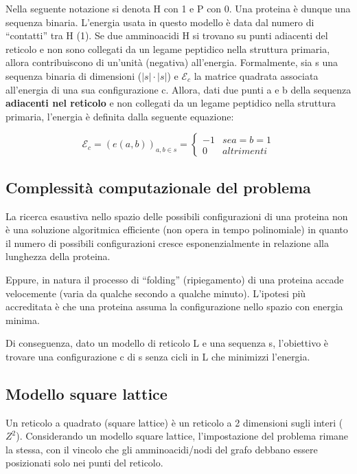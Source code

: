 \documentclass[conference]{IEEEtran}
\begin{document}
Nella seguente notazione si denota H con 1 e P con 0. Una proteina è dunque una sequenza binaria. L'energia usata in questo modello è data dal numero di ``contatti'' tra H (1). Se due amminoacidi H si trovano su punti adiacenti del reticolo e non sono collegati da un legame peptidico nella struttura primaria, allora contribuiscono di un'unità (negativa) all'energia.
Formalmente, sia s una sequenza binaria di dimensioni ($|s|\cdot|s|$) e $\mathcal{E}_c$ la matrice quadrata associata all'energia di una sua configurazione c. Allora, dati due punti a e b della sequenza \textbf{adiacenti nel reticolo} e non collegati da un legame peptidico nella struttura primaria, l'energia è definita dalla seguente equazione:

\begin{equation}
    \label{eq:en}
    \mathcal{E}_c = (e(a,b))_{a,b \in s} =
    \begin{cases*}
      -1 & se a = b = 1 \\
      0  & altrimenti
    \end{cases*}
\end{equation}

\subsection{Complessità computazionale del problema}

La ricerca esaustiva nello spazio delle possibili configurazioni di una proteina non è una soluzione algoritmica efficiente (non opera in tempo polinomiale) in quanto il numero di possibili configurazioni cresce esponenzialmente in relazione alla lunghezza della proteina.

Eppure, in natura il processo di ``folding'' (ripiegamento) di una proteina accade velocemente (varia da qualche secondo a qualche minuto). L'ipotesi più accreditata è che una proteina assuma la configurazione nello spazio con energia minima.

Di conseguenza, dato un modello di reticolo L e una sequenza s, l'obiettivo è trovare una configurazione c di s senza cicli in L che minimizzi l'energia.

\subsection{Modello square lattice}

Un reticolo a quadrato (square lattice) è un reticolo a 2 dimensioni sugli interi ($Z^2$). Considerando un modello square lattice, l'impostazione del problema rimane la stessa, con il vincolo che gli amminoacidi/nodi del grafo debbano essere posizionati solo nei punti del reticolo.
\end{document}
